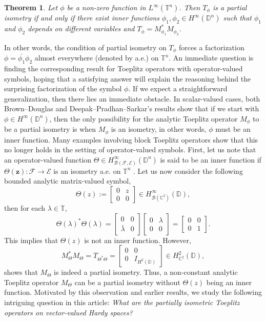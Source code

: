 \documentclass[12pt]{amsart}
\newtheorem*{thm*}{Theorem}
\theoremstyle{definition}
\newcommand{\D}{\mathbb{D}}
\newcommand{\1}{{\mbox{\bf 1}}}
\newcommand{\clb}{\mathcal{B}}
\newcommand{\cle}{\mathcal{E}}
\newcommand{\clf}{\mathcal{F}}
\newcommand{\raro}{\rightarrow}
\begin{document}
\begin{thm*}{\cite[Theorem 1.1]{KPS}}
Let $\phi$ be a non-zero function in $L^{\infty}(\mathbb{T}^n)$. Then $T_{\phi}$ is a partial isometry if and only if there exist inner functions $\phi_1, \phi_2 \in H^{\infty}(\D^n)$ such that $\phi_1$ and $\phi_2$ depends on different variables and $T_{\phi} = M_{\phi_1}^* M_{\phi_2}$. 
\end{thm*}
In other words, the condition of partial isometry on $T_{\phi}$ forces a factorization $\phi = \bar{\phi_1} \phi_2$ almost everywhere (denoted by a.e.) on $\mathbb{T}^n$. An immediate question is finding the corresponding result for Toeplitz operators with operator-valued symbols, hoping that a satisfying answer will explain the reasoning behind the surprising factorization of the symbol $\phi$. If we expect a straightforward generalization, then there lies an immediate obstacle. In scalar-valued cases, both Brown--Douglas and Deepak--Pradhan--Sarkar's results show that if we start with $\phi \in H^{\infty}(\D^n)$, then the only possibility for the analytic Toeplitz operator $M_{\phi}$ to be a partial isometry is when $M_{\phi}$ is an isometry, in other words, $\phi$ must be an inner function. Many examples involving block Toeplitz operators show that this no longer holds in the setting of operator-valued symbols. First, let us note that an operator-valued function $\Theta \in H_{\clb(\clf,\cle)}^{\infty}(\D^n)$ is said to be an inner function if $\Theta(\bm{z}): \clf \raro \cle$ is an isometry a.e. on $\mathbb{T}^n$ \cite{NF}. Let us now consider the following bounded analytic matrix-valued symbol,
\[
\Theta(z) := \begin{bmatrix}
0 &z\\
0 &0
\end{bmatrix} \in H_{\clb(\mathbb{C}^2)}^{\infty}(\D),
\]
then for each $\lambda \in \mathbb{T}$,
\[
\Theta(\lambda)^* \Theta(\lambda) = \begin{bmatrix}
0 &0\\
\bar{\lambda} &0
\end{bmatrix}  \begin{bmatrix}
0 &\lambda\\
0 &0
\end{bmatrix} = \begin{bmatrix}
0 &0\\
0 &1
\end{bmatrix}.
\]
This implies that $\Theta(z)$ is not an inner function. However, 
\[
M_{\Theta}^* M_{\Theta} = T_{\Theta^* \Theta} = \begin{bmatrix}
0 &0\\
0 & I_{H^2(\D)}
\end{bmatrix} \in H_{\mathbb{C}^2}^2(\D),
\]
shows that $M_{\Theta}$ is indeed a partial isometry. Thus, a non-constant analytic Toeplitz operator $M_{\Theta}$ can be a partial isometry without $\Theta(z)$ being an inner function.  Motivated by this observation and earlier results, we study the following intriguing question in this article: \textit{What are the partially isometric Toeplitz operators on vector-valued Hardy spaces?}
\end{document}
